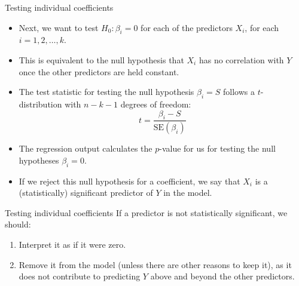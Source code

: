 \documentclass{beamer}\usepackage[]{graphicx}\usepackage[]{color}
\begin{document}
\begin{darkframes}
    \begin{frame}{Testing individual coefficients}
      \begin{itemize}[<+->]
        \item Next, we want to test $H_0 : \beta_i=0$ for each of the predictors $X_i$, for each $i=1,2,\ldots,k$.
        \item This is equivalent to the null hypothesis that $X_i$ has no correlation with $Y$ once the other predictors are held constant.
        \item The test statistic for testing the null hypothesis $\beta_i = S$ follows a $t$-distribution with $n-k-1$ degrees of freedom: \[ t = \frac{\beta_i - S}{\text{SE}(\beta_i)} \]
        \item The regression output calculates the $p$-value for us for testing the null hypotheses $\beta_i = 0$.
        \item If we reject this null hypothesis for a coefficient, we say that $X_i$  is a (statistically) significant predictor of $Y$ in the model.
      \end{itemize}
    \end{frame}

    \begin{frame}{Testing individual coefficients}
      If a predictor is not statistically significant, we should:
      \begin{enumerate}[<+->]
        \item Interpret it as if it were zero.
        \item Remove it from the model (unless there are other reasons to keep it), as it does not contribute to predicting $Y$ above and beyond the other predictors.
      \end{enumerate}
    \end{frame}



\end{darkframes}
\end{document}
